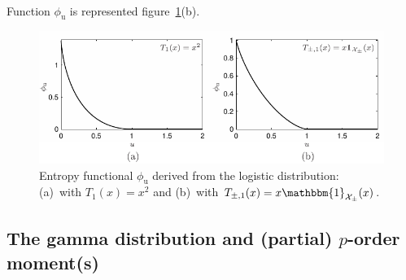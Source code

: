 \documentclass[entropy,article,submit,moreauthors,pdftex]{Definitions/mdpi}
\def\X{\mathcal{X}}%
\def\un{\mathbbm{1}}%
\begin{document}
{\

Function $\phi_{\mathrm{u}}$ is represented figure~\ref{fig:Entropy-logistic}(b).


\begin{figure}[htbp]
\centerline{\includegraphics[width=\columnwidth]{PDF/MaxEnt_LogisticLaw}}
\caption{Entropy  functional  $\phi_{\mathrm{u}}$   derived  from  the  logistic
  distribution:  (a)~with  $T_1(x)  =  x^2$   and  (b)~with  $T_{\pm,1}(x)  =  x
  \un_{\X_\pm}(x)$.}
\label{fig:Entropy-logistic}
\end{figure}
}


\subsection{The gamma distribution and (partial) $p$-order moment(s)}
\label{subsecapp:GammaFirstOrder}
\end{document}
